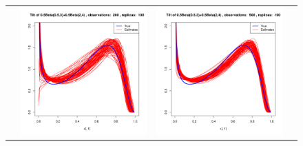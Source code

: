 \documentclass[10pt]{report}
\begin{document}
\begin{figure}[h]
\begin{tabular}{cccc}
	&
	\includegraphics[width=\textwidth/4]{../img/p05_a05_b3_p05_a2_b4/tilted/K1/densities/n200_R100.pdf}
	&
	\includegraphics[width=\textwidth/4]{../img/p05_a05_b3_p05_a2_b4/tilted/K1/densities/n500_R100.pdf}\\
	

\end{tabular}
\end{figure}
\end{document}
